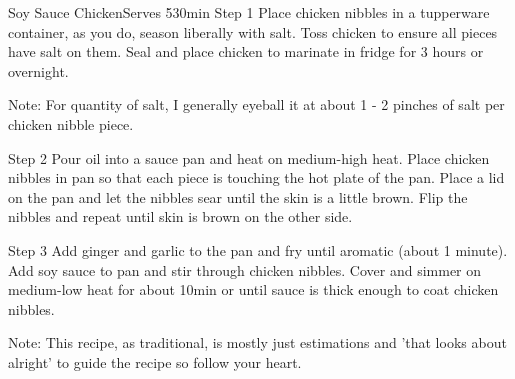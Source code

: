 \begin{recipe}{Soy Sauce Chicken}{Serves 5}{30min}
Step 1
Place chicken nibbles in a tupperware container, as you do, season liberally with salt. Toss chicken to ensure all pieces have salt on them. Seal and place chicken to marinate in fridge for 3 hours or overnight.

Note: For quantity of salt, I generally eyeball it at about 1 - 2 pinches of salt per chicken nibble piece.

Step 2
Pour oil into a sauce pan and heat on medium-high heat. Place chicken nibbles in pan so that each piece is touching the hot plate of the pan. Place a lid on the pan and let the nibbles sear until the skin is a little brown. Flip the nibbles and repeat until skin is brown on the other side.

Step 3
Add ginger and garlic to the pan and fry until aromatic (about 1 minute). Add soy sauce to pan and stir through chicken nibbles. Cover and simmer on medium-low heat for about 10min or until sauce is thick enough to coat chicken nibbles.

Note: This recipe, as traditional, is mostly just estimations and 'that looks about alright' to guide the recipe so follow your heart.
\end{recipe}
